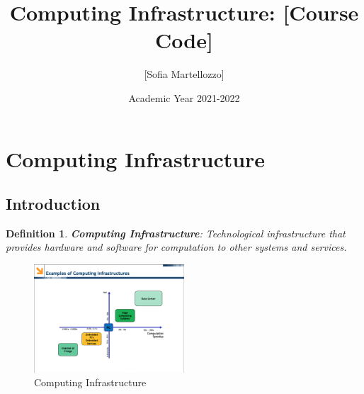 \documentclass[10pt, oneside]{article}
\title{Computing Infrastructure: [Course Code]}
\author{[Sofia Martellozzo]}
\date{Academic Year 2021-2022}
\newtheorem{defn}{Definition}
\begin{document}
\maketitle
\newpage
\tableofcontents

\vspace{.25in}
\newpage

\section{Computing Infrastructure}

\subsection{Introduction}
\begin{defn}
{\bf Computing Infrastructure}: Technological infrastructure that provides hardware and software for computation to other systems and services.
\end{defn}


\begin{figure}[H]
    \begin{center}
    \includegraphics[width=0.5\textwidth]{img/img1.png}
    \caption{Computing Infrastructure}
    \label{fig:computing infrastructure}
    \end{center}
\end{figure}
\end{document}
